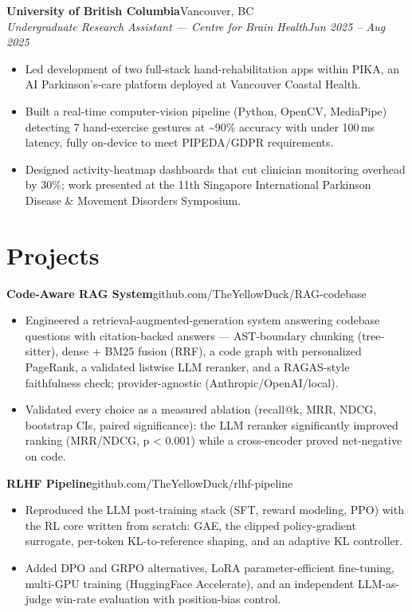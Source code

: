 \documentclass[letterpaper,11pt]{article}
\newcommand{\entry}[4]{%
  \textbf{#1}\hfill{\small #2}\\[1pt]%
  {\small\itshape #3}\hfill{\small\itshape #4}\par%
}
\newcommand{\project}[3]{%
  \textbf{#1}\enspace{\small\textcolor{accent!55}{\textbar}\enspace #2}\hfill{\small #3}\par%
}
\newenvironment{bullets}
  {\begin{itemize}[leftmargin=1.5em,labelsep=0.5em,itemsep=1pt,topsep=1pt,parsep=0pt,partopsep=0pt]\small}
  {\end{itemize}\vspace{1pt}}
\begin{document}
\entry{University of British Columbia}{Vancouver, BC}{Undergraduate Research Assistant --- Centre for Brain Health}{Jun 2025 -- Aug 2025}
\begin{bullets}
  \item Led development of two full-stack hand-rehabilitation apps within PIKA, an AI Parkinson's-care platform deployed at Vancouver Coastal Health.
  \item Built a real-time computer-vision pipeline (Python, OpenCV, MediaPipe) detecting 7 hand-exercise gestures at \textasciitilde90\% accuracy with under 100\,ms latency, fully on-device to meet PIPEDA/GDPR requirements.
  \item Designed activity-heatmap dashboards that cut clinician monitoring overhead by 30\%; work presented at the 11th Singapore International Parkinson Disease \& Movement Disorders Symposium.
\end{bullets}

\section{Projects}

\project{Code-Aware RAG System}{Python, Transformers}{github.com/TheYellowDuck/RAG-codebase}
\begin{bullets}
  \item Engineered a retrieval-augmented-generation system answering codebase questions with citation-backed answers --- AST-boundary chunking (tree-sitter), dense + BM25 fusion (RRF), a code graph with personalized PageRank, a validated listwise LLM reranker, and a RAGAS-style faithfulness check; provider-agnostic (Anthropic/OpenAI/local).
  \item Validated every choice as a measured ablation (recall@k, MRR, NDCG, bootstrap CIs, paired significance): the LLM reranker significantly improved ranking (MRR/NDCG, p \textless{} 0.001) while a cross-encoder proved net-negative on code.
\end{bullets}

\project{RLHF Pipeline}{PyTorch}{github.com/TheYellowDuck/rlhf-pipeline}
\begin{bullets}
  \item Reproduced the LLM post-training stack (SFT, reward modeling, PPO) with the RL core written from scratch: GAE, the clipped policy-gradient surrogate, per-token KL-to-reference shaping, and an adaptive KL controller.
  \item Added DPO and GRPO alternatives, LoRA parameter-efficient fine-tuning, multi-GPU training (HuggingFace Accelerate), and an independent LLM-as-judge win-rate evaluation with position-bias control.
\end{bullets}
\end{document}
